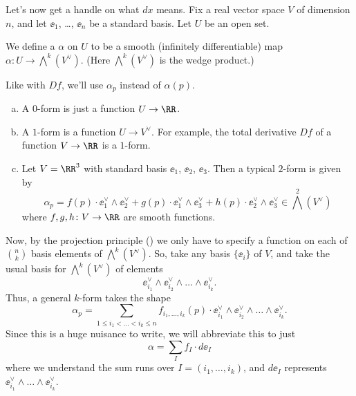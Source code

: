 Let's now get a handle on what $dx$ means.
Fix a real vector space $V$ of dimension $n$,
and let $\ee_1$, \dots, $\ee_n$ be a standard basis.
Let $U$ be an open set.

\begin{definition}
	We define a  $\alpha$ on $U$
	to be a smooth (infinitely differentiable) map
	$\alpha \colon U \to \bigwedge^k(V^\vee)$.
	(Here $\bigwedge^k(V^\vee)$ is the wedge product.)
\end{definition}

Like with $Df$, we'll use $\alpha_p$ instead of $\alpha(p)$.

\begin{example}
	[$k$-forms for $k=0,1$]
	\listhack
	\begin{enumerate}[(a)]
		\item A $0$-form is just a function $U \to \RR$.
		\item A $1$-form is a function $U \to V^\vee$.
		For example,
		the total derivative $Df$ of a function $V \to \RR$ is a $1$-form.
		\item Let $V = \RR^3$ with standard basis $\ee_1$, $\ee_2$, $\ee_3$.
		Then a typical $2$-form is given by
		\[
			\alpha_p
			=
			f(p) \cdot \ee_1^\vee \wedge \ee_2^\vee
			+ g(p) \cdot \ee_1^\vee \wedge \ee_3^\vee
			+ h(p) \cdot \ee_2^\vee \wedge \ee_3^\vee
			\in \bigwedge^2(V^\vee)
		\]
		where $f,g,h \colon V \to \RR$ are smooth functions.
	\end{enumerate}
\end{example}

Now, by the projection principle () we only have to specify
a function on each of $\binom nk$ basis elements of $\bigwedge^k(V^\vee)$.
So, take any basis $\{\ee_i\}$ of $V$, and
take the usual basis for $\bigwedge^k(V^\vee)$ of elements
\[ \ee_{i_1}^\vee \wedge \ee_{i_2}^\vee \wedge \dots \wedge \ee_{i_k}^\vee. \]
Thus, a general $k$-form takes the shape
\[ \alpha_p = \sum_{1 \le i_1 < \dots < i_k \le n}
	f_{i_1, \dots, i_k}(p) \cdot
	\ee_{i_1}^\vee \wedge \ee_{i_2}^\vee \wedge \dots \wedge \ee_{i_k}^\vee. \]
Since this is a huge nuisance to write, we will abbreviate this to just
\[ \alpha = \sum_I f_I \cdot d\ee_I \]
where we understand the sum runs over $I = (i_1, \dots, i_k)$,
and $d\ee_I$ represents $\ee_{i_1}^\vee \wedge \dots \wedge \ee_{i_k}^\vee$.

